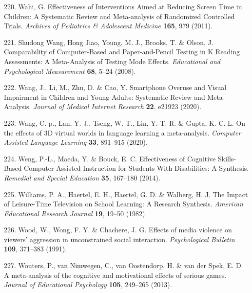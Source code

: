 \documentclass[
  english,
  man]{apa6}
\newenvironment{cslreferences}%
  {}%
  {\par}
\begin{document}
\begin{cslreferences}
\leavevmode\hypertarget{ref-wahiEffectivenessInterventionsAimed2011}{}%
220. Wahi, G. Effectiveness of Interventions Aimed at Reducing Screen Time in Children: A Systematic Review and Meta-analysis of Randomized Controlled Trials. \emph{Archives of Pediatrics \& Adolescent Medicine} \textbf{165}, 979 (2011).

\leavevmode\hypertarget{ref-shudongwangComparabilityComputerBasedPaperandPencil2008}{}%
221. Shudong Wang, Hong Jiao, Young, M. J., Brooks, T. \& Olson, J. Comparability of Computer-Based and Paper-and-Pencil Testing in K Reading Assessments: A Meta-Analysis of Testing Mode Effects. \emph{Educational and Psychological Measurement} \textbf{68}, 5--24 (2008).

\leavevmode\hypertarget{ref-wangSmartphoneOveruseVisual2020}{}%
222. Wang, J., Li, M., Zhu, D. \& Cao, Y. Smartphone Overuse and Visual Impairment in Children and Young Adults: Systematic Review and Meta-Analysis. \emph{Journal of Medical Internet Research} \textbf{22}, e21923 (2020).

\leavevmode\hypertarget{ref-wangEffects3DVirtual2020}{}%
223. Wang, C.-p., Lan, Y.-J., Tseng, W.-T., Lin, Y.-T. R. \& Gupta, K. C.-L. On the effects of 3D virtual worlds in language learning a meta-analysis. \emph{Computer Assisted Language Learning} \textbf{33}, 891--915 (2020).

\leavevmode\hypertarget{ref-wengEffectivenessCognitiveSkillsbased2014}{}%
224. Weng, P.-L., Maeda, Y. \& Bouck, E. C. Effectiveness of Cognitive Skills-Based Computer-Assisted Instruction for Students With Disabilities: A Synthesis. \emph{Remedial and Special Education} \textbf{35}, 167--180 (2014).

\leavevmode\hypertarget{ref-williamsImpactLeisuretimeTelevision1982}{}%
225. Williams, P. A., Haertel, E. H., Haertel, G. D. \& Walberg, H. J. The Impact of Leisure-Time Television on School Learning: A Research Synthesis. \emph{American Educational Research Journal} \textbf{19}, 19--50 (1982).

\leavevmode\hypertarget{ref-woodEffectsMediaViolence1991}{}%
226. Wood, W., Wong, F. Y. \& Chachere, J. G. Effects of media violence on viewers' aggression in unconstrained social interaction. \emph{Psychological Bulletin} \textbf{109}, 371--383 (1991).

\leavevmode\hypertarget{ref-woutersMetaanalysisCognitiveMotivational2013}{}%
227. Wouters, P., van Nimwegen, C., van Oostendorp, H. \& van der Spek, E. D. A meta-analysis of the cognitive and motivational effects of serious games. \emph{Journal of Educational Psychology} \textbf{105}, 249--265 (2013).


\end{cslreferences}
\end{document}

